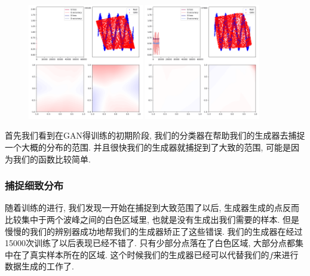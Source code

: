 \documentclass[lang=cn,11pt]{elegantpaper}
\begin{document}
\begin{figure}[hbt]
\centering
  \includegraphics[width=0.45\textwidth]{sin_2_1}
  \includegraphics[width=0.45\textwidth]{sin_2_2}\\
  \caption{}
\end{figure}

首先我们看到在GAN得训练的初期阶段, 我们的分类器在帮助我们的生成器去捕捉一个大概的分布的范围. 并且很快我们的生成器就捕捉到了大致的范围, 可能是因为我们的函数比较简单.


\subsubsection{捕捉细致分布}

随着训练的进行, 我们发现一开始在捕捉到大致范围了以后, 生成器生成的点反而比较集中于两个波峰之间的白色区域里, 也就是没有生成出我们需要的样本. 但是慢慢的我们的辨别器成功地帮我们的生成器矫正了这些错误. 我们的生成器在经过15000次训练了以后表现已经不错了. 只有少部分点落在了白色区域, 大部分点都集中在了真实样本所在的区域. 这个时候我们的生成器已经可以代替我们的$f$来进行数据生成的工作了.
\end{document}
